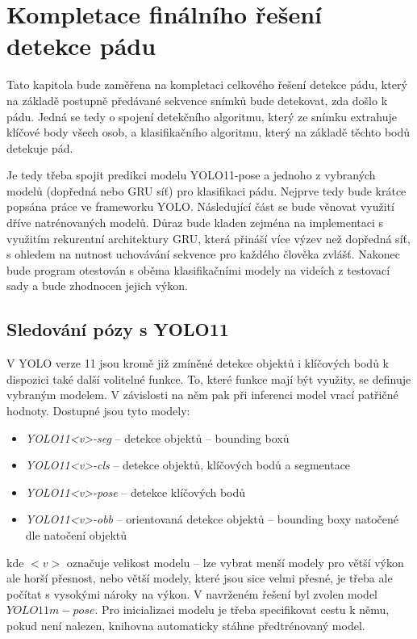 \chapter{Kompletace finálního řešení detekce pádu}
\label{chap:detectionProgram}

Tato kapitola bude zaměřena na kompletaci celkového řešení detekce pádu, který
na základě postupně předávané sekvence snímků bude detekovat, zda došlo k pádu.
Jedná se tedy o spojení detekčního algoritmu, který ze snímku extrahuje klíčové
body všech osob, a klasifikačního algoritmu, který na základě těchto bodů
detekuje pád.

Je tedy třeba spojit predikci modelu YOLO11-pose a jednoho z vybraných modelů
(dopředná nebo GRU síť) pro klasifikaci pádu. Nejprve tedy bude krátce popsána
práce ve frameworku YOLO. Následující část se bude věnovat využití dříve
natrénovaných modelů. Důraz bude kladen zejména na implementaci s využitím
rekurentní architektury GRU, která přináší více výzev než dopředná síť, s
ohledem na nutnost uchovávání sekvence pro každého člověka zvlášť. Nakonec bude
program otestován s oběma klasifikačními modely na videích z testovací sady a
bude zhodnocen jejich výkon.

\section{Sledování pózy s YOLO11}

V YOLO verze 11 jsou kromě již zmíněné detekce objektů i klíčových bodů k
dispozici také další volitelné funkce. To, které funkce mají být využity, se
definuje vybraným modelem. V závislosti na něm pak při inferenci model vrací
patřičné hodnoty. Dostupné jsou tyto modely:
\begin{itemize}
    \item \textit{YOLO11<v>-seg } – detekce objektů – bounding boxů
    \item \textit{YOLO11<v>-cls } – detekce objektů, klíčových bodů a segmentace
    \item \textit{YOLO11<v>-pose} – detekce klíčových bodů
    \item \textit{YOLO11<v>-obb } – orientovaná detekce objektů – bounding boxy natočené dle natočení objektů
\end{itemize}

kde $<v>$ označuje velikost modelu – lze vybrat menší modely pro větší výkon
ale horší přesnost, nebo větší modely, které jsou sice velmi přesné, je třeba
ale počítat s vysokými nároky na výkon. V navrženém řešení byl zvolen model
$YOLO11m-pose$. Pro inicializaci modelu je třeba specifikovat cestu k němu,
pokud není nalezen, knihovna automaticky stáhne předtrénovaný model.

